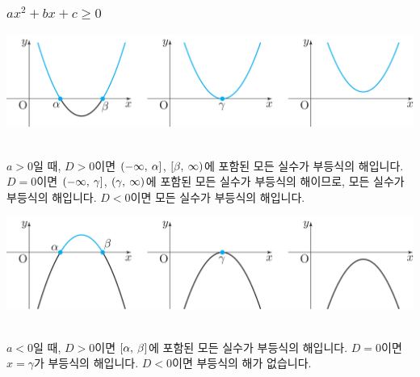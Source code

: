 \subsubsection{$ax^2 + bx + c \ge 0$}
\begin{center} \includegraphics[scale=\pgfkeysvalueof{picsize}]{DBs/pic/zery_25.pdf}\
	\end{center}$a>0$일 때, $D>0$이면 $\left(-\infty,\: \alpha\right]$, $\left[\beta,\: \infty\right)$에 포함된 모든 실수가 부등식의 해입니다. $D=0$이면 $\left(-\infty,\: \gamma\right]$, $\left(\gamma,\: \infty\right)$에 포함된 모든 실수가 부등식의 해이므로, 모든 실수가 부등식의 해입니다.  $D<0$이면 모든 실수가 부등식의 해입니다.
\begin{center} \includegraphics[scale=\pgfkeysvalueof{picsize}]{DBs/pic/zery_25_1.pdf}\
	\end{center}$a<0$일 때, $D>0$이면 $\left[\alpha,\: \beta\right]$에 포함된 모든 실수가 부등식의 해입니다. $D=0$이면 $x=\gamma$가 부등식의 해입니다. $D<0$이면 부등식의 해가 없습니다.

